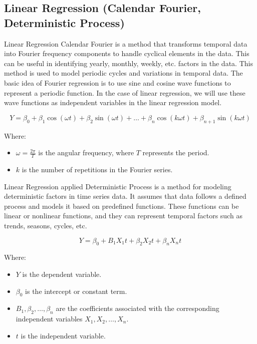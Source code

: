 \documentclass[conference]{IEEEtran}
\begin{document}
\subsection{Linear Regression (Calendar Fourier, Deterministic Process)}
Linear Regression Calendar Fourier is a method that transforms temporal data into Fourier frequency components to handle cyclical elements in the data. This can be useful in identifying yearly, monthly, weekly, etc. factors in the data. This method is used to model periodic cycles and variations in temporal data. The basic idea of Fourier regression is to use sine and cosine wave functions to represent a periodic function. In the case of linear regression, we will use these wave functions as independent variables in the linear regression model. \cite{FourierTimeSeries}

\[Y = \beta_0 + \beta_1 \cos(\omega t) + \beta_2 \sin(\omega t) + \ldots + \beta_n \cos(k \omega t) + \beta_{n+1} \sin(k \omega t)\]

Where:
\begin{itemize}
    \item \(\omega = \frac{2\pi}{T}\) is the angular frequency, where \(T\) represents the period.
    \item \(k\) is the number of repetitions in the Fourier series.
\end{itemize}

Linear Regression applied Deterministic Process is a method for modeling deterministic factors in time series data. It assumes that data follows a defined process and models it based on predefined functions. These functions can be linear or nonlinear functions, and they can represent temporal factors such as trends, seasons, cycles, etc.

\[Y = \beta_0 + B_1 X_1 t + \beta_2 X_2 t + \beta_n X_n t\]

Where:
\begin{itemize}
    \item \(Y\) is the dependent variable.
    \item \(\beta_0\) is the intercept or constant term.
    \item \(B_1, \beta_2, \ldots, \beta_n\) are the coefficients associated with the corresponding independent variables \(X_1, X_2, \ldots, X_n\).
    \item \(t\) is the independent variable.
\end{itemize}
\end{document}

